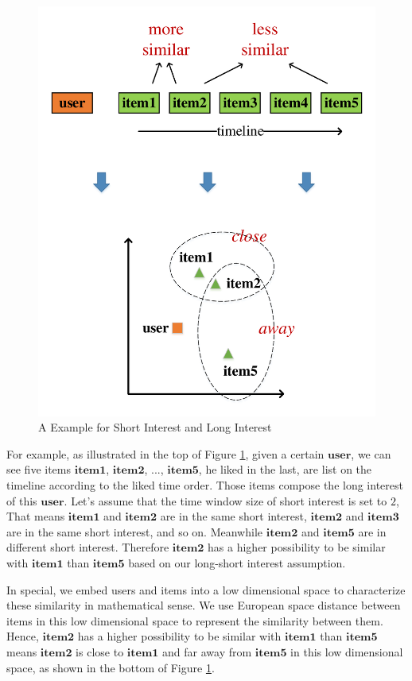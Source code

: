 \documentclass{sig-alternate-05-2015}
\begin{document}
\begin{figure}[htbp]
	\centering
	\includegraphics[scale=0.5]{images/embedding.pdf}
	\caption{A Example for Short Interest and Long Interest}
	\label{fig:embedding}
\end{figure}

For example, as illustrated in the top of Figure \ref{fig:embedding},
given a certain $\mathbf{user}$, we can see five items
$\mathbf{item1}$, $\mathbf{item2}$, ..., $\mathbf{item5}$, he liked in the last,
are list on the timeline according to the liked time order.
Those items compose the long interest of this $\mathbf{user}$.
Let's assume that the time window size of short interest is set to $2$,
That means $\mathbf{item1}$ and $\mathbf{item2}$ are in the same short interest,
$\mathbf{item2}$ and $\mathbf{item3}$ are in the same short interest, and so on.
Meanwhile $\mathbf{item2}$ and $\mathbf{item5}$ are in different short interest.
Therefore $\mathbf{item2}$ has a higher possibility to be similar with $\mathbf{item1}$
than $\mathbf{item5}$ based on our long-short interest assumption.

In special, we embed users and items into a low dimensional space
to characterize these similarity in mathematical sense.
We use European space distance between items in this low dimensional space
to represent the similarity between them.
Hence, $\mathbf{item2}$ has a higher possibility to be similar with $\mathbf{item1}$
than $\mathbf{item5}$ means $\mathbf{item2}$ is close to $\mathbf{item1}$ and far away from $\mathbf{item5}$
in this low dimensional space, as shown in the bottom of Figure \ref{fig:embedding}.
\end{document}

